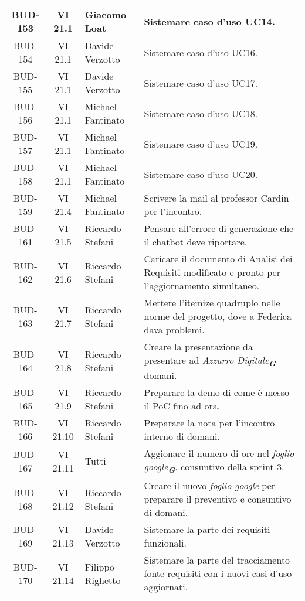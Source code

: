 \begin{table}[htbp]
\begin{tabular}{|c|c|p{}|p{}|}
    \hline
    BUD-153 & VI 21.1 & Giacomo Loat & Sistemare caso d'uso UC14. \\
    \hline
    BUD-154 & VI 21.1 & Davide Verzotto & Sistemare caso d'uso UC16. \\
    \hline
    BUD-155 & VI 21.1 & Davide Verzotto & Sistemare caso d'uso UC17. \\
    \hline
    BUD-156 & VI 21.1 & Michael Fantinato & Sistemare caso d'uso UC18. \\
    \hline
    BUD-157 & VI 21.1 & Michael Fantinato & Sistemare caso d'uso UC19. \\
    \hline
    BUD-158 & VI 21.1 & Michael Fantinato & Sistemare caso d'uso UC20. \\
    \hline
    BUD-159 & VI 21.4 & Michael Fantinato & Scrivere la mail al professor Cardin per l'incontro. \\
    \hline
    BUD-161 & VI 21.5 & Riccardo Stefani & Pensare all'errore di generazione che il chatbot deve riportare. \\
    \hline
    BUD-162 & VI 21.6 & Riccardo Stefani & Caricare il documento di Analisi dei Requisiti modificato e pronto per l'aggiornamento simultaneo. \\
    \hline
    BUD-163 & VI 21.7 & Riccardo Stefani  & Mettere l'itemize quadruplo nelle norme del progetto, dove a Federica dava problemi. \\
    \hline
    BUD-164 & VI 21.8 & Riccardo Stefani & Creare la presentazione da presentare ad \emph{Azzurro Digitale}\textsubscript{\textit{\textbf{G}}} domani. \\
    \hline
    BUD-165 & VI 21.9 & Riccardo Stefani & Preparare la demo di come è messo il PoC fino ad ora. \\
    \hline
    BUD-166 & VI 21.10 & Riccardo Stefani & Preparare la nota per l'incontro interno di domani. \\
    \hline
    BUD-167 & VI 21.11 & Tutti & Aggionare il numero di ore nel \emph{foglio google}\textsubscript{\textit{\textbf{G}}}. consuntivo della sprint 3. \\
    \hline
    BUD-168 & VI 21.12 & Riccardo Stefani & Creare il nuovo \emph{foglio google} per preparare il preventivo e consuntivo di domani. \\
    \hline
    BUD-169 & VI 21.13 & Davide Verzotto & Sistemare la parte dei requisiti funzionali. \\
    \hline
    BUD-170 & VI 21.14 & Filippo Righetto & Sistemare la parte del tracciamento fonte-requisiti con i nuovi casi d'uso aggiornati. \\
    \hline

\end{tabular}
\end{table}



